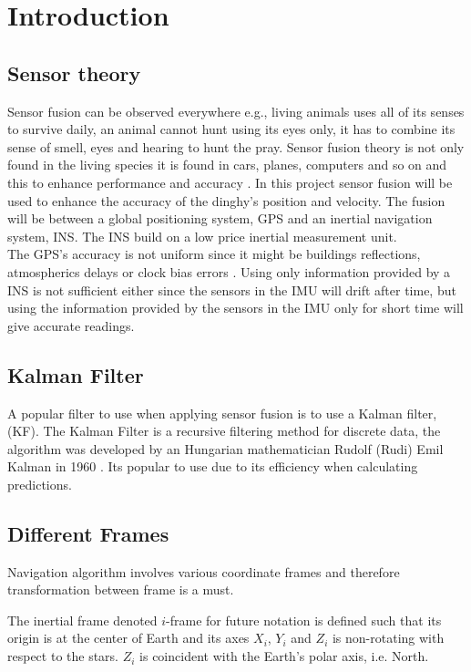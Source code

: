 


\section{Introduction}
\subsection*{Sensor theory}
Sensor fusion can be observed everywhere e.g., living animals uses all of its senses to survive daily, an animal cannot hunt using its eyes only, it has to combine its sense of smell, eyes and hearing to hunt the pray\cite{animal}. Sensor fusion theory is not only found in the living species it is found in cars, planes, computers and so on and this to enhance performance and accuracy \cite{animal}. In this project sensor fusion will be used to enhance the accuracy of the dinghy's position and velocity. The fusion will be between a global positioning system, GPS and an inertial navigation system, INS. The INS build on a low price inertial measurement unit.\\ 
The GPS's accuracy is not uniform since it might be buildings reflections, atmospherics delays or clock bias errors \cite{boken}. Using only information provided by a INS is not sufficient either since the sensors in the IMU will drift after time, but using the information provided by the sensors in the IMU only for short time will give accurate readings.  


\subsection{Kalman Filter}
A popular filter to use when applying sensor fusion is to use a Kalman filter, (KF). The Kalman Filter is a recursive filtering method for discrete data, the algorithm was developed by an Hungarian mathematician Rudolf (Rudi) Emil Kalman in 1960 \cite{boken}. Its popular to use due to its efficiency when calculating predictions. \cite{kf eff}

\subsection*{Different Frames}
Navigation algorithm involves various coordinate frames and therefore transformation between frame is a must.

The inertial frame denoted $i$-frame for future notation is defined such that its origin is at the center of Earth and its axes $X_i$, $Y_i$ and $Z_i$ is non-rotating with respect to the stars. $Z_i$ is coincident with the Earth's polar axis, i.e. North.\\

